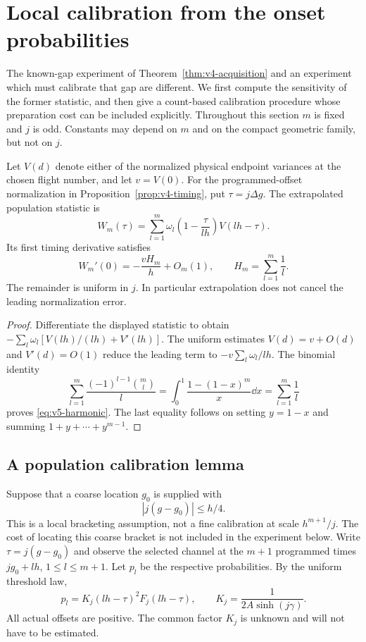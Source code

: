 \section{Local calibration from the onset probabilities}
\label{sec:v5-calibration}
The known-gap experiment of Theorem~\ref{thm:v4-acquisition} and an
experiment which must calibrate that gap are different. We first compute
the sensitivity of the former statistic, and then give a count-based
calibration procedure whose preparation cost can be included explicitly.
Throughout this section $m$ is fixed and $j$ is odd. Constants may depend
on $m$ and on the compact geometric family, but not on $j$.

\begin{proposition}\label{prop:v5-harmonic}
Let $V(d)$ denote either of the normalized physical endpoint variances
at the chosen flight number, and let $v=V(0)$. For the programmed-offset
normalization in Proposition~\ref{prop:v4-timing}, put $\tau=j\Delta g$.
The extrapolated population statistic is
\[
 W_m(\tau)=\sum_{l=1}^m\omega_l
                \left(1-\frac{\tau}{lh}\right)V(lh-\tau).
\]
Its first timing derivative satisfies
\begin{equation}\label{eq:v5-harmonic}
 W_m'(0)=-\frac{vH_m}{h}+O_m(1),\qquad
 H_m=\sum_{l=1}^m\frac1l.
\end{equation}
The remainder is uniform in $j$. In particular extrapolation does not
cancel the leading normalization error.
\end{proposition}
\begin{proof}
Differentiate the displayed statistic to obtain
$-\sum_l\omega_l[V(lh)/(lh)+V'(lh)]$. The uniform estimates
$V(d)=v+O(d)$ and $V'(d)=O(1)$ reduce the leading term to
$-v\sum_l\omega_l/lh$. The binomial identity
\[
 \sum_{l=1}^m\frac{(-1)^{l-1}\binom ml}{l}
 =\int_0^1\frac{1-(1-x)^m}{x}\dd x
 =\sum_{l=1}^m\frac1l
\]
proves \eqref{eq:v5-harmonic}. The last equality follows on setting
$y=1-x$ and summing $1+y+\cdots+y^{m-1}$.
\end{proof}

\subsection{A population calibration lemma}
Suppose that a coarse location $g_0$ is supplied with
\begin{equation}\label{eq:v5-coarse-gap}
                 |j(g-g_0)|\le h/4.
\end{equation}
This is a local bracketing assumption, not a fine calibration at scale
$h^{m+1}/j$. The cost of locating this coarse bracket is not included
in the experiment below. Write $\tau=j(g-g_0)$ and observe the selected
channel at the $m+1$ programmed times $jg_0+lh$, $1\le l\le m+1$.
Let $p_l$ be the respective probabilities. By the uniform threshold law,
\begin{equation}\label{eq:v5-calibration-probability}
 p_l=K_j(lh-\tau)^2F_j(lh-\tau),\qquad
 K_j=\frac1{2A\sinh(j\gamma)}.
\end{equation}
All actual offsets are positive. The common factor $K_j$ is unknown
and will not have to be estimated.

